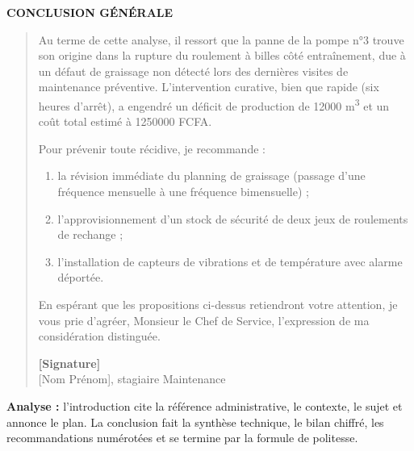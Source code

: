 \documentclass[11pt]{article}
\newcommand{\cle}[1]{{\popxbold\color{popdark}#1}}
\begin{document}
\begin{exoresolu}
    \textbf{CONCLUSION GÉNÉRALE}
    \begin{quote}
    Au terme de cette analyse, il ressort que la panne de la pompe n°3 trouve son origine dans la rupture du roulement à billes côté entraînement, due à un défaut de graissage non détecté lors des dernières visites de maintenance préventive. L'intervention curative, bien que rapide (six heures d'arrêt), a engendré un déficit de production de \num{12000} m\textsuperscript{3} et un coût total estimé à \num{1250000} FCFA.

    Pour prévenir toute récidive, je recommande :
    \begin{enumerate}
        \item la révision immédiate du planning de graissage (passage d'une fréquence mensuelle à une fréquence bimensuelle) ;
        \item l'approvisionnement d'un stock de sécurité de deux jeux de roulements de rechange ;
        \item l'installation de capteurs de vibrations et de température avec alarme déportée.
    \end{enumerate}

    En espérant que les propositions ci-dessus retiendront votre attention, je vous prie d'agréer, Monsieur le Chef de Service, l'expression de ma considération distinguée.

    \hfill \textbf{[Signature]} \\
    \hfill [Nom Prénom], stagiaire Maintenance
    \end{quote}
    \textbf{Analyse :} l'introduction cite la \cle{référence administrative}, le \cle{contexte}, le \cle{sujet} et \cle{annonce le plan}. La conclusion fait la \cle{synthèse technique}, le \cle{bilan chiffré}, les \cle{recommandations numérotées} et se termine par la \cle{formule de politesse}.
\end{exoresolu}
\end{document}
